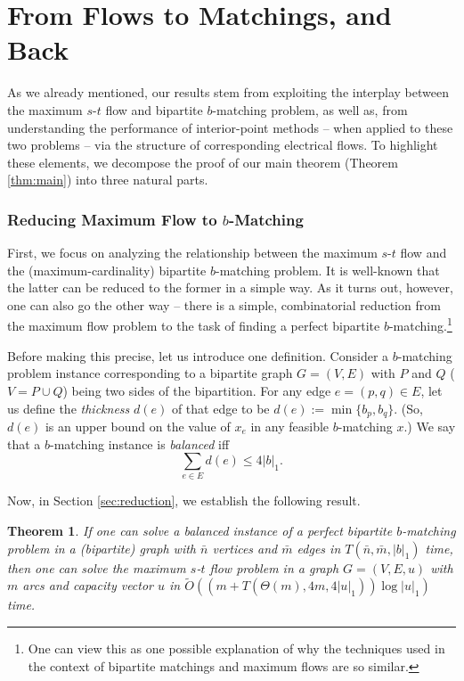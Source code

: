 \documentclass[11pt, letterpaper]{article}
\newtheorem{theorem}{Theorem}[section]
\newcommand{\onorm}[1]{|#1|_{1}}
\newcommand{\tO}[1]{\widetilde{O}(#1)}
\newcommand{\om}{\bar{m}}
\newcommand{\on}{\bar{n}}
\newcommand{\bb}{\boldsymbol{\mathit{b}}}
\newcommand{\uu}{\boldsymbol{\mathit{u}}}
\newcommand{\xx}{\boldsymbol{\mathit{x}}}
\begin{document}
 \section{From Flows to Matchings, and Back}\label{sec:outline}


As we already mentioned, our results stem from exploiting the interplay between the maximum $s$-$t$ flow and bipartite $\bb$-matching problem, as well as, from understanding the performance of interior-point methods -- when applied to these two problems -- via the structure of corresponding electrical flows. To highlight these elements, we decompose the proof of our main theorem (Theorem \ref{thm:main}) into three natural parts.

\subsubsection*{Reducing Maximum Flow to $\bb$-Matching}

First, we focus on analyzing the relationship between the maximum $s$-$t$ flow and the (maximum-cardinality) bipartite $\bb$-matching problem. It is well-known that the latter  can be reduced to the former in a simple way. As it turns out, however, one can also go the other way -- there is a simple, combinatorial reduction from the maximum flow problem to the task of finding a perfect bipartite $\bb$-matching.\footnote{One can view this as one possible explanation of why the techniques used in the context of bipartite matchings and maximum flows are so similar.} 

Before making this precise, let us introduce one definition. Consider a $\bb$-matching problem instance corresponding to a bipartite graph $G=(V,E)$ with $P$ and $Q$ ($V=P\cup Q$) being two sides of the bipartition. For any edge $e=(p,q)\in E$, let us define the {\em thickness} $d(e)$ of that edge to be $d(e):=\min\{b_p,b_q\}$. (So, $d(e)$ is an upper bound on the value of $x_e$ in any feasible $\bb$-matching $\xx$.) We say that a $\bb$-matching instance is {\em balanced} iff 
\begin{equation}
\label{eq:def_balanced}
\sum_{e\in E} d(e)\leq 4\onorm{\bb}.  
\end{equation}

Now, in Section \ref{sec:reduction}, we establish the following result.

\begin{theorem}\label{thm:flow_to_matchings}
If one can solve a balanced instance of a perfect bipartite $\bb$-matching problem in a (bipartite) graph with  $\on$ vertices and $\om$ edges in $T(\on,\om,\onorm{\bb})$ time, then one can solve the maximum $s$-$t$ flow problem in a graph $G=(V,E,\uu)$ with $m$ arcs and capacity vector $\uu$ in $\tO{(m+T(\Theta(m),4m,4\onorm{\uu}))\log \onorm{\uu}}$ time. 
\end{theorem}
\end{document}
